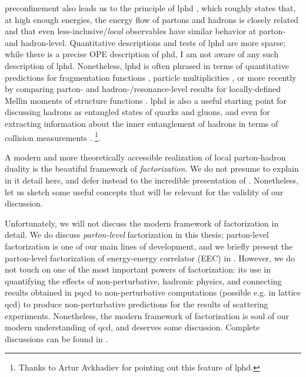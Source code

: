 \Gls{preconfinement} also leads us to  the principle of \gls{lphd} \cite{Azimov:1984np,Dokshitzer:1991eq}, which roughly states that, at high enough energies, the energy flow of partons and hadrons is closely related and that even less-inclusive/\textit{local} observables have similar behavior at parton- and hadron-level.
%
Quantitative descriptions and tests of \gls{lphd} are more sparse;
%
while there is a precise OPE description of \gls{phd}, I am not aware of any such description of \gls{lphd}.
%
Nonetheless, \gls{lphd} is often phrased in terms of quantitative predictions for fragmentation functions \cite{Dokshitzer:1991eq,Dokshitzer:1991fc}, particle multiplicities \cite{Andersson:1989ww}, or more recently by comparing parton- and hadron-/resonance-level results for locally-defined Mellin moments of structure functions \cite{Psaker:2008ju}.
%
\gls{lphd} is also a useful starting point for discussing hadrons as entangled states of quarks and gluons, and even for extracting information about the inner entanglement of hadrons in terms of collision measurements \cite{Tu:2019ouv,Hentschinski:2021aux,Hentschinski:2022rsa,Hentschinski:2023izh,Hentschinski:2024gaa}.%
\footnote{
    Thanks to Artur Avkhadiev for pointing out this feature of \gls{lphd}.
}.


A modern and more theoretically accessible realization of local parton-hadron duality is the beautiful framework of \textit{factorization}.
%
We do not presume to explain in it detail here, and defer instead to the incredible presentation of .
%
Nonetheless, let us sketch some useful concepts that will be relevant for the validity of our discussion.


Unfortunately, we will not discuss the modern framework of factorization in detail.
%
We do discuss \textit{parton-level} factorization in this thesis;
%
parton-level  factorization is one of our main lines of development, and we briefly present the parton-level  factorization of energy-energy correlator (EEC) in .
%
However, we do not touch on one of the most important powers of factorization:
%
its use in quantifying the effects of non-perturbative, hadronic physics, and connecting results obtained in \gls{pqcd} to non-perturbative computations (possible e.g. in lattice \gls{qcd}) to produce non-perturbative predictions for the results of scattering experiments.
%
Nonetheless, the modern framework of factorization is soul of our modern understanding of \gls{qcd}, and deserves some discussion.
%
Complete discussions can be found in .


